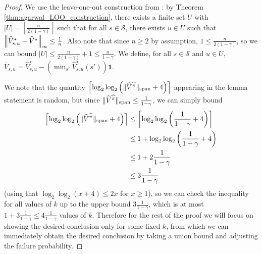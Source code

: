 \documentclass{article}
\theoremstyle{plain}
\theoremstyle{plain}
\theoremstyle{remark}
\theoremstyle{plain}
\theoremstyle{plain}
\newcommand{\Vhat}{\widehat{V}}
\newcommand{\one}{\mathbf{1}}
\newcommand{\pihat}{\widehat{\pi}}
\newcommand{\Vhatstar}{\widehat{V}^\star}
\newcommand{\Vc}{\overline{V}}
\renewcommand{\S}{\mathcal{S}}
\begin{document}
\begin{proof}

We use the leave-one-out construction from \cite{agarwal_model-based_2020}: by Theorem \ref{thm:agarwal_LOO_construction}, there exists a finite set $U$ with $|U|=\left\lceil \frac{n}{2(1-\gamma)} \right\rceil$ such that for all $s \in \S$, there exists $u \in U$ such that $\infnorm{\Vhatstar_{s, u} - \Vhatstar} \leq \frac{1}{n}$. Also note that since $n \geq 2$ by assumption, $1 \leq \frac{n}{2(1-\gamma)}$, so we can bound $|U| \leq \frac{n}{2(1-\gamma)} + 1 \leq \frac{n}{1-\gamma}$.
We define, for all $s \in \S$ and $u \in U$, $\Vc_{s,u} = \Vhatstar_{s,u} - \left(\min_{s'} \Vhatstar_{s,u}(s')\right)\one$.

We note that the quantity $\left\lceil\log_2 \log_2 \left( \spannorm{\Vhat^{\pihat}} + 4\right) \right\rceil$ appearing in the lemma statement is random, but since $\spannorm{\Vhat^{\pihat}} \leq \frac{1}{1-\gamma}$, we can simply bound
\begin{align}
    \left\lceil\log_2 \log_2 \left( \spannorm{\Vhat^{\pihat}} + 4\right) \right\rceil &\leq \left\lceil\log_2 \log_2 \left( \frac{1}{1-\gamma} + 4\right) \right\rceil \nonumber\\
     &\leq 1 + \log_2 \log_2 \left( \frac{1}{1-\gamma} + 4\right) \nonumber\\
     &\leq 1 + 2 \frac{1}{1-\gamma} \nonumber\\
     & \leq 3 \frac{1}{1-\gamma} \label{eq:LOO_ineq_bound_on_ks}
\end{align}
(using that $\log_2 \log_2 (x+4) \leq 2x$ for $x \geq 1$), so we can check the inequality for all values of $k$ up to the upper bound $3 \frac{1}{1-\gamma}$, which is at most $1 + 3 \frac{1}{1-\gamma} \leq 4 \frac{1}{1-\gamma}$ values of $k$.
Therefore for the rest of the proof we will focus on showing the desired conclusion only for some fixed $k$, from which we can immediately obtain the desired conclusion by taking a union bound and adjusting the failure probability.


\end{proof}
\end{document}

